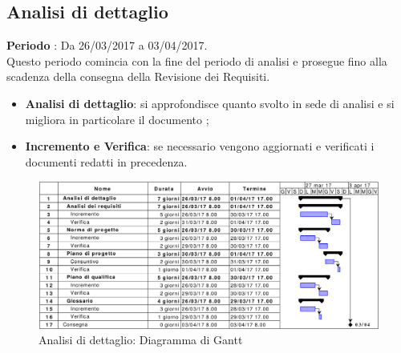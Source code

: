 \documentclass[../PianoDiProgetto.tex]{subfiles}
\begin{document}
			
			
		\subsection{Analisi di dettaglio}
		\textbf{Periodo} : Da 26/03/2017 a 03/04/2017. \\
		Questo periodo comincia con la fine del periodo di analisi e prosegue fino alla scadenza della consegna della Revisione dei Requisiti.
		\begin{itemize}
			\item \textbf{Analisi di dettaglio}: si approfondisce quanto svolto in sede di analisi e si migliora in particolare il documento \analisideirequisiti ;
			\item \textbf{Incremento e Verifica}: se necessario vengono aggiornati e verificati i documenti redatti in precedenza.
		\end{itemize}
		\begin{figure}[H]
			\centering
			\includegraphics[scale=0.55]{Figures/Gantt_AnalisiDettaglio.jpg}
			\caption{Analisi di dettaglio: Diagramma di Gantt}
		\end{figure}
	
	
	
\end{document}
